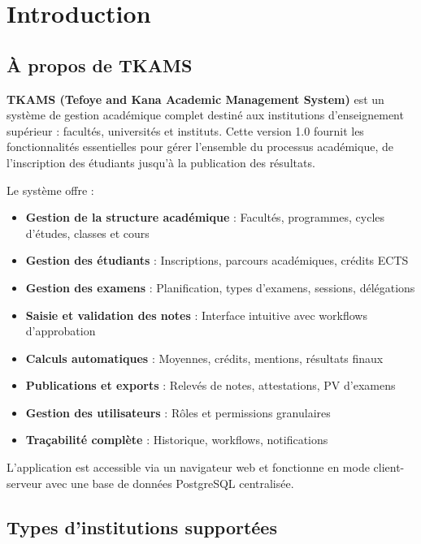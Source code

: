 \section{Introduction}

\subsection{À propos de TKAMS}

\textbf{TKAMS (Tefoye and Kana Academic Management System)} est un système de gestion académique complet destiné aux institutions d'enseignement supérieur : facultés, universités et instituts. Cette version 1.0 fournit les fonctionnalités essentielles pour gérer l'ensemble du processus académique, de l'inscription des étudiants jusqu'à la publication des résultats.


Le système offre :

\begin{itemize}[leftmargin=*]
    \item \textbf{Gestion de la structure académique} : Facultés, programmes, cycles d'études, classes et cours
    \item \textbf{Gestion des étudiants} : Inscriptions, parcours académiques, crédits ECTS
    \item \textbf{Gestion des examens} : Planification, types d'examens, sessions, délégations
    \item \textbf{Saisie et validation des notes} : Interface intuitive avec workflows d'approbation
    \item \textbf{Calculs automatiques} : Moyennes, crédits, mentions, résultats finaux
    \item \textbf{Publications et exports} : Relevés de notes, attestations, PV d'examens
    \item \textbf{Gestion des utilisateurs} : Rôles et permissions granulaires
    \item \textbf{Traçabilité complète} : Historique, workflows, notifications
\end{itemize}

L'application est accessible via un navigateur web et fonctionne en mode client-serveur avec une base de données PostgreSQL centralisée.

\subsection{Types d'institutions supportées}

